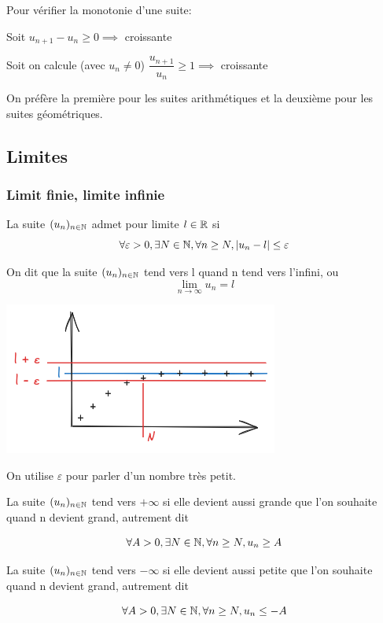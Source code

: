 \documentclass[a4paper, 12pt]{article}
\begin{document}
\begin{remark}
    Pour vérifier la monotonie d'une suite:

    \item Soit $u_{n+1} - u_n \geq 0 \implies$ croissante
    \item Soit on calcule (avec $u_n \neq 0$) $\dfrac{u_{n+1}}{u_n} \geq 1 \implies$ croissante

    On préfère la première pour les suites arithmétiques et la deuxième pour les suites géométriques.
\end{remark}

\subsection{Limites}

\subsubsection{Limit finie, limite infinie}

\begin{definition}
    La suite $(u_n)_{n \in \mathbb{N}}$ admet pour limite $l \in \mathbb{R}$ si
    $$
    \forall \varepsilon > 0, \exists N \in \mathbb{N}, \forall n \geq N, |u_n - l| \leq \varepsilon
    $$

    On dit que la suite $(u_n)_{n \in \mathbb{N}}$ tend vers l quand n tend vers l'infini, ou
    $$
    \lim_{n \to \infty} u_n = l
    $$
\end{definition}

\includegraphics{img/limite.png}

\begin{remark}
    On utilise $\varepsilon$ pour parler d'un nombre très petit.
\end{remark}

\begin{definition}
    La suite $(u_n)_{n \in \mathbb{N}}$ tend vers $+\infty$ si elle devient aussi grande que l'on souhaite quand n
    devient grand, autrement dit

    $$
    \forall A > 0, \exists N \in \mathbb{N}, \forall n \geq N, u_n \geq A
    $$

    La suite $(u_n)_{n \in \mathbb{N}}$ tend vers $-\infty$ si elle devient aussi petite que l'on souhaite quand n
    devient grand, autrement dit

    $$
    \forall A > 0, \exists N \in \mathbb{N}, \forall n \geq N, u_n \leq -A
    $$
\end{definition}
\end{document}
